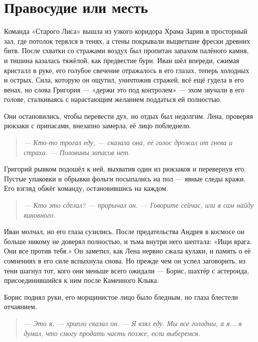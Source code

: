\documentclass[12pt,a4paper]{book}
\newenvironment{dialogue}{\begin{quote}\itshape}{\end{quote}}
\begin{document}
\chapter{Правосудие или месть}

Команда «Старого Лиса» вышла из узкого коридора Храма Зарии в просторный зал, где потолок терялся в тенях, а стены покрывали выцветшие фрески древних битв. После схватки со стражами воздух был пропитан запахом палёного камня, и тишина казалась тяжёлой, как предвестие бури. Иван шёл впереди, сжимая кристалл в руке, его голубое свечение отражалось в его глазах, теперь холодных и острых. Сила, которую он ощутил, уничтожив стражей, всё ещё гудела в его венах, но слова Григория --- «держи это под контролем» --- эхом звучали в его голове, сталкиваясь с нарастающим желанием поддаться ей полностью.

Они остановились, чтобы перевести дух, но отдых был недолгим. Лена, проверяя рюкзаки с припасами, внезапно замерла, её лицо побледнело.

\begin{dialogue}
--- Кто-то трогал еду, --- сказала она, её голос дрожал от гнева и страха. --- Половины запасов нет.
\end{dialogue}

Григорий рывком подошёл к ней, выхватив один из рюкзаков и перевернув его. Пустые упаковки и обрывки фольги посыпались на пол --- явные следы кражи. Его взгляд обжёг команду, остановившись на каждом.

\begin{dialogue}
--- Кто это сделал? --- прорычал он. --- Говорите сейчас, или я сам найду виновного.
\end{dialogue}

Иван молчал, но его глаза сузились. После предательства Андрея в космосе он больше никому не доверял полностью, и тьма внутри него шептала: «Ищи врага. Они все против тебя.» Он заметил, как Лена нервно сжала кулаки, и память о её сомнениях в его силе вспыхнула снова. Но прежде чем он успел заговорить, из тени шагнул тот, кого они меньше всего ожидали --- Борис, шахтёр с астероида, присоединившийся к ним после Каменного Клыка.

Борис поднял руки, его морщинистое лицо было бледным, но глаза блестели отчаянием.

\begin{dialogue}
--- Это я, --- хрипло сказал он. --- Я взял еду. Мы все голодны, а я... я думал, что смогу продать часть позже, если выберемся.
\end{dialogue}
\end{document}
